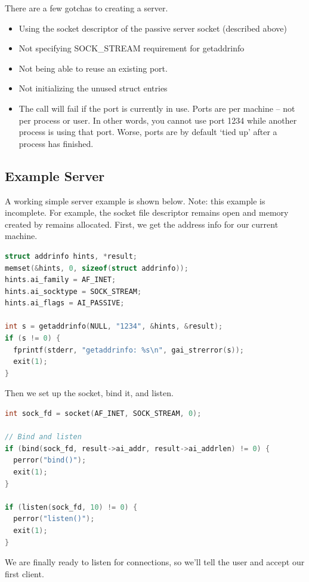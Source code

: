 There are a few gotchas to creating a server.

\begin{itemize}
\item
  Using the socket descriptor of the passive server socket (described above)
\item
  Not specifying SOCK\_STREAM requirement for getaddrinfo
\item
  Not being able to reuse an existing port.
\item
  Not initializing the unused struct entries
\item
  The  call will fail if the port is currently in use. Ports are per machine -- not per process or user.
  In other words, you cannot use port 1234 while another process is using that port.
  Worse, ports are by default `tied up' after a process has finished.
\end{itemize}

\subsection{Example Server}

A working simple server example is shown below.
Note: this example is incomplete. For example, the socket file descriptor remains open and memory created by  remains allocated.
First, we get the address info for our current machine.

\begin{lstlisting}[language=C]
struct addrinfo hints, *result;
memset(&hints, 0, sizeof(struct addrinfo));
hints.ai_family = AF_INET;
hints.ai_socktype = SOCK_STREAM;
hints.ai_flags = AI_PASSIVE;

int s = getaddrinfo(NULL, "1234", &hints, &result);
if (s != 0) {
  fprintf(stderr, "getaddrinfo: %s\n", gai_strerror(s));
  exit(1);
}
\end{lstlisting}

Then we set up the socket, bind it, and listen.

\begin{lstlisting}[language=C]
int sock_fd = socket(AF_INET, SOCK_STREAM, 0);

// Bind and listen
if (bind(sock_fd, result->ai_addr, result->ai_addrlen) != 0) {
  perror("bind()");
  exit(1);
}

if (listen(sock_fd, 10) != 0) {
  perror("listen()");
  exit(1);
}
\end{lstlisting}

We are finally ready to listen for connections, so we'll tell the user and accept our first client.

